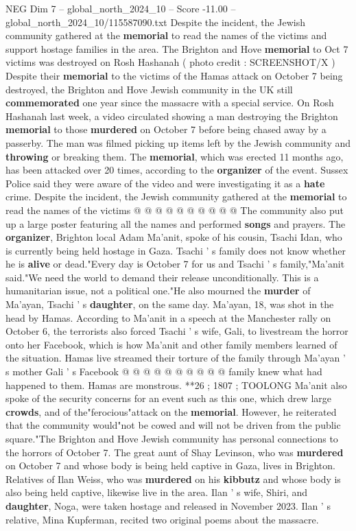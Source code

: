 \begin{textsample}{NEG Dim 7 – global\_north\_2024\_10 – Score -11.00 – global\_north\_2024\_10/115587090.txt}  \label{ex:f7_neg_036}
Despite the incident, the Jewish community gathered at the \textbf{memorial} to read the names of the victims and support hostage families in the area.
The Brighton and Hove \textbf{memorial} to Oct 7 victims was destroyed on Rosh Hashanah ( photo credit : SCREENSHOT/X ) Despite their \textbf{memorial} to the victims of the Hamas attack on October 7 being destroyed, the Brighton and Hove Jewish community in the UK still \textbf{commemorated} one year since the massacre with a special service.
On Rosh Hashanah last week, a video circulated showing a man destroying the Brighton \textbf{memorial} to those \textbf{murdered} on October 7 before being chased away by a passerby.
The man was filmed picking up items left by the Jewish community and \textbf{throwing} or breaking them.
The \textbf{memorial}, which was erected 11 months ago, has been attacked over 20 times, according to the \textbf{organizer} of the event.
Sussex Police said they were aware of the video and were investigating it as a \textbf{hate} crime.
Despite the incident, the Jewish community gathered at the \textbf{memorial} to read the names of the victims @ @ @ @ @ @ @ @ @ @ The community also put up a large poster featuring all the names and performed \textbf{songs} and prayers.
The \textbf{organizer}, Brighton local Adam Ma'anit, spoke of his cousin, Tsachi Idan, who is currently being held hostage in Gaza.
Tsachi ' s family does not know whether he is \textbf{alive} or dead."Every day is October 7 for us and Tsachi ' s family,"Ma'anit said."We need the world to demand their release unconditionally.
This is a humanitarian issue, not a political one."He also mourned the \textbf{murder} of Ma'ayan, Tsachi ' s \textbf{daughter}, on the same day.
Ma'ayan, 18, was shot in the head by Hamas.
According to Ma'anit in a speech at the Manchester rally on October 6, the terrorists also forced Tsachi ' s wife, Gali, to livestream the horror onto her Facebook, which is how Ma'anit and other family members learned of the situation.
Hamas live streamed their torture of the family through Ma'ayan ' s mother Gali ' s Facebook @ @ @ @ @ @ @ @ @ @ family knew what had happened to them.
Hamas are monstrous. **26 ; 1807 ; TOOLONG Ma'anit also spoke of the security concerns for an event such as this one, which drew large \textbf{crowds}, and of the"ferocious"attack on the \textbf{memorial}.
However, he reiterated that the community would"not be cowed and will not be driven from the public square."The Brighton and Hove Jewish community has personal connections to the horrors of October 7.
The great aunt of Shay Levinson, who was \textbf{murdered} on October 7 and whose body is being held captive in Gaza, lives in Brighton.
Relatives of Ilan Weiss, who was \textbf{murdered} on his \textbf{kibbutz} and whose body is also being held captive, likewise live in the area.
Ilan ' s wife, Shiri, and \textbf{daughter}, Noga, were taken hostage and released in November 2023.
Ilan ' s relative, Mina Kupferman, recited two original poems about the massacre.

\end{textsample}
